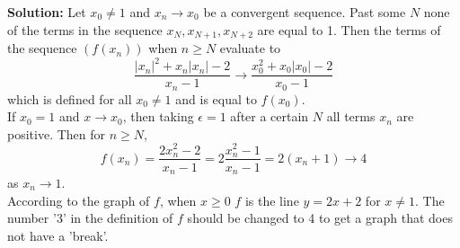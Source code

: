 \documentclass{article}
\newcommand{\solution}[1]{\setlength{\hangindent}{\parindent} \indent\indent \textbf{Solution: }#1\hfill\break}
\begin{document}
\solution{Let $x_0 \neq 1$ and $x_n\to x_0$ be a convergent sequence. Past some $N$ none of the terms in the sequence $x_N, x_{N+1}, x_{N+2}$ are equal to 1. Then the terms of the sequence $(f(x_n))$ when $n\geqslant N$ evaluate to 
$$\frac{|x_n|^2 + x_n|x_n| - 2}{x_n-1} \to \frac{x_0^2 + x_0|x_0| - 2}{x_0-1}$$
which is defined for all $x_0 \neq 1$ and is equal to $f(x_0)$. \\
\indent If $x_0 = 1$ and $x\to x_0$, then taking $\epsilon = 1$ after a certain $N$ all terms $x_n$ are positive. Then for $n\geqslant N$,
$$f(x_n) = \frac{2x_n^2 - 2}{x_n-1} = 2\frac{x_n^2-1}{x_n-1} = 2(x_n+1) \to 4$$
as $x_n \to 1$. \\
\indent According to the graph of $f$, when $x\geqslant 0$ $f$ is the line $y = 2x + 2$ for $x\neq 1$. The number '3' in the definition of $f$ should be changed to 4 to get a graph that does not have a 'break'.} %

\newpage
\end{document}
